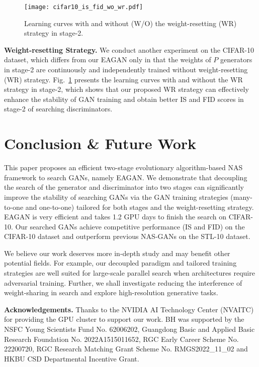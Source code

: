 \documentclass[runningheads]{llncs}
\begin{document}
\begin{figure}
    \centering
    \texttt{[image: cifar10\_is\_fid\_wo\_wr.pdf]}


    \caption{Learning curves with and without (W/O) the weight-resetting (WR) strategy in stage-2.}
    \label{fig:effect_wr}
\end{figure}




\textbf{Weight-resetting Strategy.} We conduct another experiment on the CIFAR-10 dataset, which differs from our EAGAN only in that the weights of $P$ generators in stage-2 are continuously and independently trained without weight-resetting (WR) strategy. Fig.~\ref{fig:effect_wr} presents the learning curves with and without the WR strategy in stage-2, which shows that our proposed WR strategy can effectively enhance the stability of GAN training and obtain better IS and FID scores in stage-2 of searching discriminators.






\section{Conclusion \&  Future Work}


This paper proposes an efficient two-stage evolutionary algorithm-based NAS framework to search GANs, namely EAGAN.  We demonstrate that decoupling the search of the generator and discriminator into two stages can significantly improve the stability of searching GANs via the GAN training strategies (many-to-one and one-to-one) tailored for both stages and the weight-resetting strategy. EAGAN is very efficient and takes 1.2 GPU days to finish the search on CIFAR-10. Our searched GANs achieve competitive performance (IS and FID) on the CIFAR-10 dataset and outperform previous NAS-GANs on the STL-10 dataset. 

We believe our work deserves more in-depth study and may benefit other potential fields. For example, our decoupled paradigm and tailored training strategies are well suited for large-scale parallel search when architectures require adversarial training. Further, we shall investigate reducing the interference of weight-sharing in search and explore high-resolution generative tasks.

\noindent\textbf{Acknowledgements.} Thanks to the NVIDIA AI Technology Center (NVAITC) for providing the GPU cluster to support our work. BH was supported by the NSFC Young Scientists Fund No. 62006202, Guangdong Basic and Applied Basic Research Foundation No. 2022A1515011652, RGC Early Career Scheme No. 22200720, RGC Research Matching Grant Scheme No. RMGS2022\_11\_02 and HKBU CSD Departmental Incentive Grant.










\end{document}
